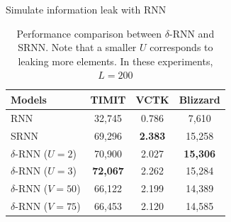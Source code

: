 \documentclass[final]{beamer}
\newlength{\colwidth}
\begin{document}
\begin{frame}[t]
\begin{columns}[t]
\begin{column}{\colwidth}
\begin{block}{Simulate information leak with RNN}
	\begin{table}[!h]
		\small
		\centering
		\begin{tabular}{l|c c c}
			\toprule
			\bf Models               & \bf TIMIT  & \bf VCTK  & \bf Blizzard \\
			\midrule
			RNN                       & 32,745     & 0.786     & 7,610  \\
			SRNN                      & 69,296       & \bf 2.383 & 15,258 \\
			\midrule
			$\delta$-RNN ($U = 2$)   & 70,900     & 2.027     & \bf 15,306 \\
			$\delta$-RNN ($U = 3$)   & \bf 72,067 & 2.262     & 15,284 \\
			\midrule
			$\delta$-RNN ($V = 50$)  & 66,122     & 2.199     & 14,389 \\
			$\delta$-RNN ($V = 75$)  & 66,453     & 2.120     & 14,585 \\
			\bottomrule
		\end{tabular}
		\caption{Performance comparison between $\delta$-RNN and SRNN. Note that a smaller $U$ corresponds to leaking more elements. In these experiments, $L=200$}
		\vspace{-1.5em}
		\label{tab:inter_step_correlation}
	\end{table}
\end{block}


\end{column}
\end{columns}
\end{frame}
\end{document}
